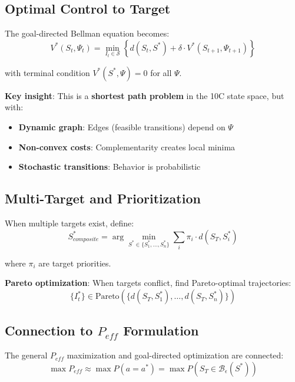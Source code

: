 \subsection{Optimal Control to Target}

The goal-directed Bellman equation becomes:
\begin{equation}
\boxed{
V^*(S_t, \Psi_t) = \min_{I_t \in \mathcal{S}} \left\{ d(S_t, S^*) + \delta \cdot V^*(S_{t+1}, \Psi_{t+1}) \right\}
}
\label{eq:mp-bellman-target}
\end{equation}

with terminal condition $V^*(S^*, \Psi) = 0$ for all $\Psi$.

\textbf{Key insight}: This is a \textbf{shortest path problem} in the 10C state space, but with:
\begin{itemize}
\item \textbf{Dynamic graph}: Edges (feasible transitions) depend on $\Psi$
\item \textbf{Non-convex costs}: Complementarity creates local minima
\item \textbf{Stochastic transitions}: Behavior is probabilistic
\end{itemize}

\subsection{Multi-Target and Prioritization}

When multiple targets exist, define:
\begin{equation}
S^*_{composite} = \arg\min_{S^* \in \{S^*_1, \ldots, S^*_n\}} \sum_{i} \pi_i \cdot d(S_T, S^*_i)
\label{eq:mp-multi-target}
\end{equation}

where $\pi_i$ are target priorities.

\textbf{Pareto optimization}: When targets conflict, find Pareto-optimal trajectories:
\begin{equation}
\{I^*_t\} \in \text{Pareto}(\{d(S_T, S^*_1), \ldots, d(S_T, S^*_n)\})
\end{equation}

\subsection{Connection to $P_{eff}$ Formulation}

The general $P_{eff}$ maximization and goal-directed optimization are connected:
\begin{equation}
\max P_{eff} \approx \max P(a = a^*) = \max P(S_T \in \mathcal{B}_\epsilon(S^*))
\end{equation}

